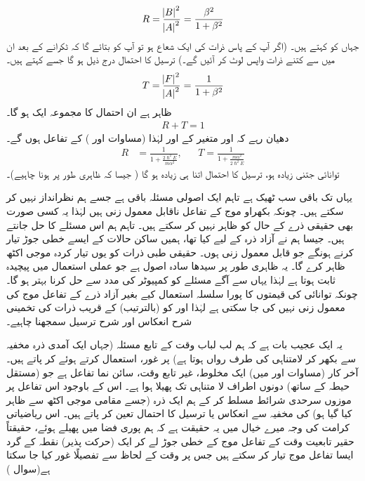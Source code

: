 \begin{align}
R=\frac{\abs B^{2}}{\abs A^{2}}=\frac{\beta^{2}}{1+\beta^{2}}
\end{align}
جہاں کو کہتے ہیں۔ (اگر آپ کے پاس ذرات کی ایک شعاع ہو تو  آپ کو بتائے گا کہ ٹکرانے کے بعد ان میں سے کتنے ذرات واپس لوٹ کر آئیں گے۔) ترسیل کا احتمال درج ذیل ہو گا جسے کہتے ہیں۔
\begin{align}
T=\frac{\abs F^{2}}{\abs A^{2}}=\frac{1}{1+\beta^{2}}
\end{align}
 ظاہر ہے ان احتمال کا مجموعہ ایک  ہو گا۔
 \begin{align}
 R+T=1
 \end{align}
 دھیان رہے کہ  اور  متغیر  کے اور لہٰذا (مساوات  اور )  کے تفاعل ہوں گے۔
 \begin{align}\label{مساوات_شروڈنگر_انعکاس_ترسیل_مستقل}
 R&=\frac{1}{1+\tfrac{2\hslash^{2}E}{m\alpha^{2}}},&& T =\frac{1}{1+\tfrac{m\alpha^{2}}{2\hslash^{2}E}}
 \end{align} 
توانائی جتنی زیادہ ہو، ترسیل کا احتمال اتنا ہی زیادہ ہو گا ( جیسا کہ ظاہری طور پر ہونا چاہیے)۔ 
 
 یہاں تک باقی سب ٹھیک ہے تاہم ایک اصولی مسئلہ باقی ہے جسے ہم نظرانداز نہیں کر سکتے ہیں۔ چونکہ بکھراو موج کے تفاعل ناقابل معمول زنی ہیں لہٰذا یہ کسی صورت بھی حقیقی ذرے کے حال کو ظاہر نہیں کر سکتے ہیں۔ تاہم ہم اس مسئلے کا حل جانتے ہیں۔ جیسا ہم نے آزاد ذرہ کے لیے کیا تھا، ہمیں ساکن حالات کے ایسے خطی جوڑ تیار کرنے ہونگے جو قابل معمول زنی ہوں۔ حقیقی طبی ذرات کو یوں تیار کردہ موجی اکٹھ ظاہر کرے گا۔ یہ ظاہری طور پر سیدھا سادہ اصول ہے جو عملی استعمال میں پیچیدہ ثابت ہوتا ہے لہٰذا یہاں سے آگے مسئلے کو کمپیوٹر کی مدد سے حل کرنا بہتر ہو گا۔ چونکہ توانائی کی قیمتوں کا پورا سلسلہ استعمال کیے بغیر آزاد ذرے کے تفاعل موج کی معمول زنی نہیں کی جا سکتی ہے لہٰذا  اور  کو (بالترتیب)  کے قریب ذرات کی تخمینی شرح انعکاس اور شرح ترسیل سمجھنا چاہیے۔ 
 
 یہ ایک عجیب بات ہے کہ ہم لب لباب وقت کے تابع مسئلہ (جہاں ایک آمدی ذرہ مخفیہ سے بکھر کر لامتناہی کی طرف رواں ہوتا ہے) پر غور،  استعمال کرتے ہوئے کر پاتے ہیں۔ آخر کار (مساوات  اور  میں) ایک مخلوط، غیر تابع وقت، سائن نما تفاعل ہے جو (مستقل حیطہ کے ساتھ) دونوں اطراف لا متناہی تک پھیلا ہوا ہے۔ اس کے باوجود اس تفاعل پر موزوں سرحدی شرائط مسلط کر کے ہم ایک ذرہ (جسے مقامی موجی اکٹھ سے ظاہر کیا گیا ہو) کی مخفیہ سے انعکاس یا ترسیل کا احتمال تعین کر پاتے ہیں۔ اس ریاضیاتی کرامت کی وجہ میرے خیال میں یہ حقیقت ہے کہ ہم پوری فضا میں پھیلے ہوئے، حقیقتاً حقیر تابعیت وقت کے تفاعل موج کے خطی جوڑ لے کر ایک (حرکت پذیر) نقطہ کے گرد ایسا تفاعل موج تیار کر سکتے ہیں جس پر وقت کے لحاظ سے تفصیلًا غور کیا جا سکتا ہے(سوال )
 
